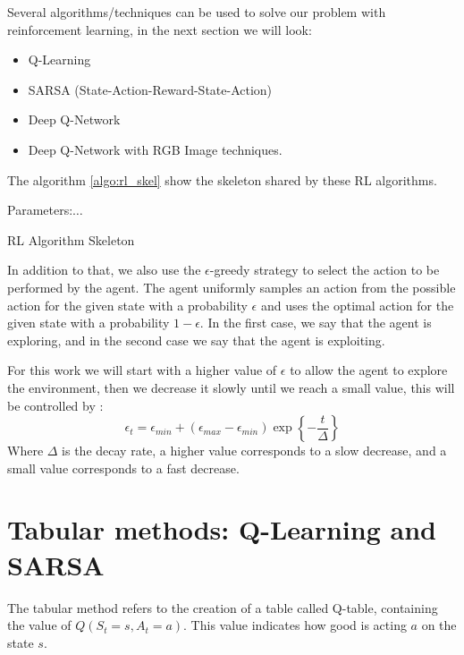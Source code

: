 Several algorithms/techniques can be used  to solve our problem with reinforcement learning, in the next section we will look:
\begin{itemize}
	\item Q-Learning
	\item SARSA (State-Action-Reward-State-Action)
	\item Deep Q-Network
	\item Deep Q-Network with RGB Image techniques.
\end{itemize}
The algorithm \ref{algo:rl_skel} show the skeleton shared by these RL algorithms.
\begin{algorithm}
	Parameters:$\ldots$\\
	\caption{RL Algorithm Skeleton}
	\label{algo:rl_skel}
\end{algorithm}
In addition to that, we also use the $\epsilon$-greedy strategy to select the action to be performed by the agent. The agent uniformly samples an action from the possible action for the given state with a probability $\epsilon$ and uses the optimal action for the given state with a probability $1-\epsilon$. In the first case, we say that the agent is exploring, and in the second case we say that the agent is exploiting.


For this work we will start with a higher value of $\epsilon$ to allow the agent to explore the environment, then we decrease it slowly until we reach a small value, this will be controlled by :
\begin{equation}
	\epsilon_t = \epsilon_{min} + \left(\epsilon_{max} - \epsilon_{min}\right) \exp\left\{-\frac{t}{\Delta}\right\}
\end{equation}
Where $\Delta$ is the decay rate, a higher value corresponds to a slow decrease, and a small value corresponds to a fast decrease.
\section{Tabular methods: Q-Learning and SARSA}\label{sec3}
The tabular method refers to the creation of a table called Q-table, containing the value of $Q(S_t=s, A_t=a)$. This value indicates how good is acting $a$ on the state $s$.

